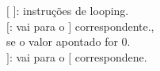 \documentclass[preview]{standalone}
\begin{document}
$[$ $]$: instruções de looping.\\$[$: vai para o $]$ correspondente.,\\se o valor apontado for 0.\\$]$: vai para o $[$ correspondene.\\
\end{document}
